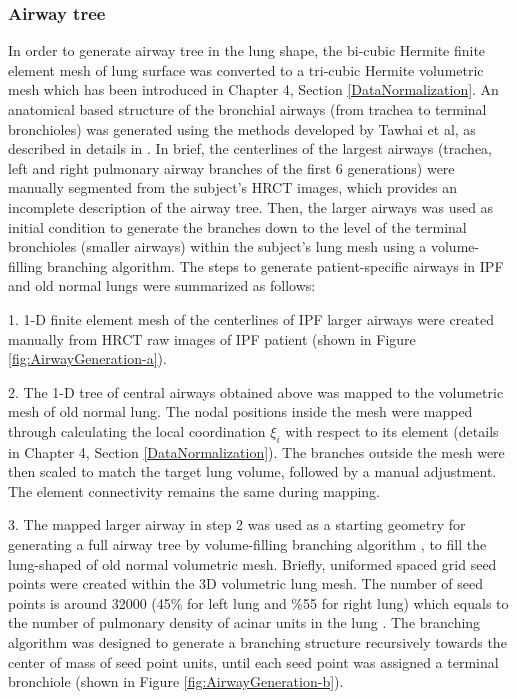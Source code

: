 \subsubsection{Airway tree}
In order to generate airway tree in the lung shape, the bi-cubic Hermite finite element mesh of lung surface was converted to a tri-cubic Hermite volumetric mesh which has been introduced in Chapter 4, Section \ref{DataNormalization}. An anatomical based structure of the bronchial airways (from trachea to terminal bronchioles) was generated using the methods developed by Tawhai et al, as described in details in \cite{tawhai2000generation, tawhai2004ct}. In brief, the centerlines of the largest airways (trachea, left and right pulmonary airway branches of the first 6 generations) were manually segmented from the subject's HRCT images, which provides an incomplete description of the airway tree. Then, the larger airways was used as initial condition to generate the branches down to the level of the terminal bronchioles (smaller airways) within the subject's lung mesh using a volume-filling branching algorithm. The steps to generate patient-specific airways in IPF and old normal lungs were summarized as follows:

1. 1-D finite element mesh of the centerlines of IPF larger airways were created manually from HRCT raw images of IPF patient (shown in Figure \ref{fig:AirwayGeneration-a}).

2. The 1-D tree of central airways obtained above was mapped to the volumetric mesh of old normal lung. The nodal positions inside the mesh were mapped through calculating the local coordination $\xi_{i}$ with respect to its element (details in Chapter 4, Section \ref{DataNormalization}). The branches outside the mesh were then scaled to match the target lung volume, followed by a manual adjustment. The element connectivity remains the same during mapping.

3. The mapped larger airway in step 2 was used as a starting geometry for generating a full airway tree by volume-filling branching algorithm \citep{tawhai2000generation, tawhai2004ct}, to fill the lung-shaped of old normal volumetric mesh. Briefly, uniformed spaced grid seed points were created within the 3D volumetric lung mesh. The number of seed points is around 32000 (45\% for left lung and \%55 for right lung) which equals to the number of pulmonary density of acinar units in the lung \citep{haefeli1988morphometry}. The branching algorithm was designed to generate a branching structure recursively towards the center of mass of seed point units, until each seed point was assigned a terminal bronchiole (shown in Figure \ref{fig:AirwayGeneration-b}). 

